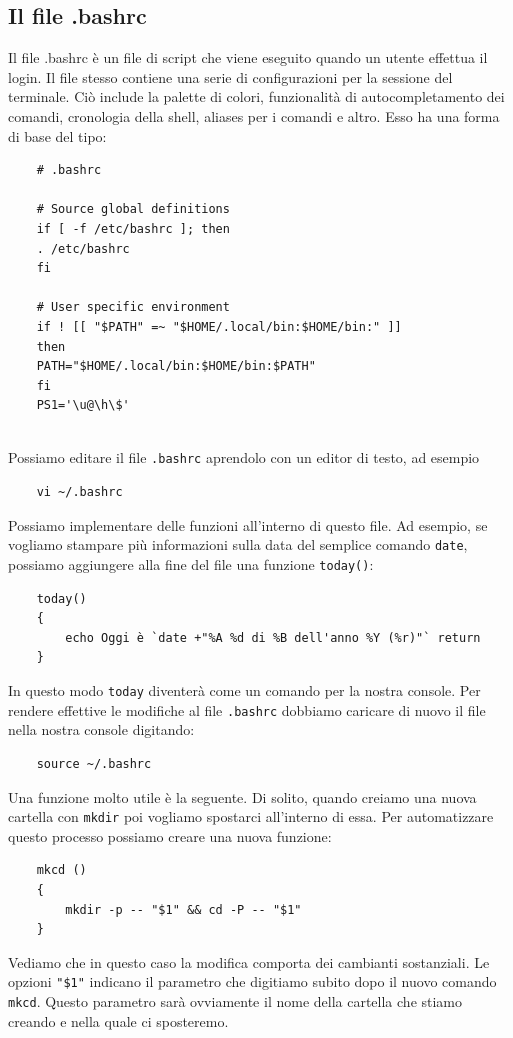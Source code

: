 \documentclass[11pt]{book}
\begin{document}
\subsection{Il file .bashrc}
Il file .bashrc è un file di script che viene eseguito quando un utente effettua il login. Il file stesso contiene una serie di configurazioni per la sessione del terminale. Ciò include la palette di colori, funzionalità di autocompletamento dei comandi, cronologia della shell, aliases per i comandi e altro. Esso ha una forma di base del tipo:
\begin{verbatim}
	# .bashrc
	
	# Source global definitions
	if [ -f /etc/bashrc ]; then
	. /etc/bashrc
	fi
	
	# User specific environment
	if ! [[ "$PATH" =~ "$HOME/.local/bin:$HOME/bin:" ]]
	then
	PATH="$HOME/.local/bin:$HOME/bin:$PATH"
	fi
	PS1='\u@\h\$'
	
\end{verbatim}
Possiamo editare il file \verb*|.bashrc| aprendolo con un editor di testo, ad esempio
\begin{verbatim}
	vi ~/.bashrc
\end{verbatim}

Possiamo implementare delle funzioni all'interno di questo file. Ad esempio, se vogliamo stampare più informazioni sulla data del semplice comando \verb*|date|, possiamo aggiungere alla fine del file una funzione \verb*|today()|:
\begin{verbatim}
	today()
	{
		echo Oggi è `date +"%A %d di %B dell'anno %Y (%r)"` return
	}
\end{verbatim}
In questo modo \verb*|today| diventerà come un comando per la nostra console. Per rendere effettive le modifiche al file \verb*|.bashrc| dobbiamo caricare di nuovo il file nella nostra console digitando:
\begin{verbatim}
	source ~/.bashrc
\end{verbatim}
Una funzione molto utile è la seguente. Di solito, quando creiamo una nuova cartella con \verb*|mkdir| poi vogliamo spostarci all'interno di essa. Per automatizzare questo processo possiamo creare una nuova funzione:
\begin{verbatim}
	mkcd ()
	{
		mkdir -p -- "$1" && cd -P -- "$1"
	}
\end{verbatim}
Vediamo che in questo caso la modifica comporta dei cambianti sostanziali. Le opzioni \verb*|"$1"| indicano il parametro che digitiamo subito dopo il nuovo comando \verb*|mkcd|. Questo parametro sarà ovviamente il nome della cartella che stiamo creando e nella quale ci sposteremo. 
\end{document}
